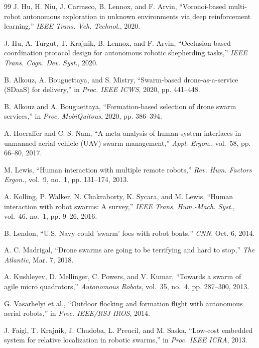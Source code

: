 \documentclass[journal,twoside]{IEEEtran}
\begin{document}
\begin{thebibliography}{99}
J. Hu, H. Niu, J. Carrasco, B. Lennox, and F. Arvin, ``Voronoi-based multi-robot autonomous exploration in unknown environments via deep reinforcement learning,'' \emph{IEEE Trans. Veh. Technol.}, 2020.

J. Hu, A. Turgut, T. Krajnik, B. Lennox, and F. Arvin, ``Occlusion-based coordination protocol design for autonomous robotic shepherding tasks,'' \emph{IEEE Trans. Cogn. Dev. Syst.}, 2020.

B. Alkouz, A. Bouguettaya, and S. Mistry, ``Swarm-based drone-as-a-service ({SDaaS}) for delivery,'' in \emph{Proc. IEEE ICWS}, 2020, pp. 441--448.

B. Alkouz and A. Bouguettaya, ``Formation-based selection of drone swarm services,'' in \emph{Proc. MobiQuitous}, 2020, pp. 386--394.

A. Hocraffer and C. S. Nam, ``A meta-analysis of human-system interfaces in unmanned aerial vehicle ({UAV}) swarm management,'' \emph{Appl. Ergon.}, vol.~58, pp. 66--80, 2017.

M. Lewis, ``Human interaction with multiple remote robots,'' \emph{Rev. Hum. Factors Ergon.}, vol.~9, no.~1, pp. 131--174, 2013.

A. Kolling, P. Walker, N. Chakraborty, K. Sycara, and M. Lewis, ``Human interaction with robot swarms: A survey,'' \emph{IEEE Trans. Hum.-Mach. Syst.}, vol.~46, no.~1, pp. 9--26, 2016.

B. Lendon, ``{U.S.} Navy could 'swarm' foes with robot boats,'' \emph{CNN}, Oct. 6, 2014.

A. C. Madrigal, ``Drone swarms are going to be terrifying and hard to stop,'' \emph{The Atlantic}, Mar. 7, 2018.

A. Kushleyev, D. Mellinger, C. Powers, and V. Kumar, ``Towards a swarm of agile micro quadrotors,'' \emph{Autonomous Robots}, vol.~35, no.~4, pp. 287--300, 2013.

G. Vasarhelyi et al., ``Outdoor flocking and formation flight with autonomous aerial robots,'' in \emph{Proc. IEEE/RSJ IROS}, 2014.

J. Faigl, T. Krajnik, J. Chudoba, L. Preucil, and M. Saska, ``Low-cost embedded system for relative localization in robotic swarms,'' in \emph{Proc. IEEE ICRA}, 2013.


\end{thebibliography}
\end{document}
